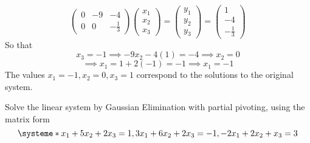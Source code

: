 \begin{solution}
\[\begin{pmatrix}
         0 & -9 & -4\\
         0 & 0 & -\frac{1}{3}
       \end{pmatrix}
       \begin{pmatrix}
         x_{1}\\
         x_{2}\\
         x_{3}
       \end{pmatrix}
=
       \begin{pmatrix}
         y_{1}\\
         y_{2}\\
         y_{3}
       \end{pmatrix}
=
       \begin{pmatrix}
         1\\
         -4\\
         -\frac{1}{3}
       \end{pmatrix}
\]
    So that
    \[
x_{3} = -1 \implies -9x_{2} - 4(1) = -4
      \implies x_{2} = 0
\]
    \[
\implies x_{1} = 1 + 2(-1) = -1 \implies
      x_{1} = -1
\]
    The values
    \(x_{1} = -1, x_{2} = 0, x_{3} = 1\) correspond
    to the solutions to the original system.
  \end{solution}

\begin{problem}
  Solve the linear system by Gaussian Elimination with partial pivoting, using the
  matrix form
  \[
\systeme*{x_{1} + 5x_{2} + 2x_{3} = 1, 3x_{1} + 6x_{2} + 2x_{3} = -1,
      -2x_{1} + 2x_{2} + x_{3} = 3}
\]
\end{problem}

